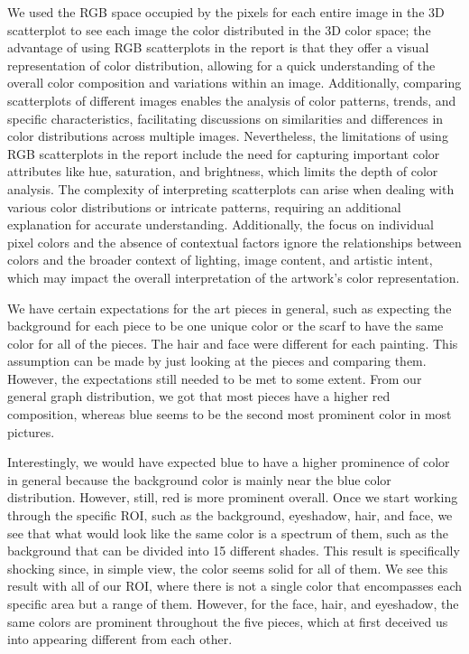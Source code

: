 \documentclass{article}
\begin{document}
We used the RGB space occupied by the pixels for each entire image in
the 3D scatterplot to see each image the color distributed in the 3D
color space; the advantage of using RGB scatterplots in the report is
that they offer a visual representation of color distribution, allowing
for a quick understanding of the overall color composition and
variations within an image. Additionally, comparing scatterplots of
different images enables the analysis of color patterns, trends, and
specific characteristics, facilitating discussions on similarities and
differences in color distributions across multiple images. Nevertheless,
the limitations of using RGB scatterplots in the report include the need
for capturing important color attributes like hue, saturation, and
brightness, which limits the depth of color analysis. The complexity of
interpreting scatterplots can arise when dealing with various color
distributions or intricate patterns, requiring an additional explanation
for accurate understanding. Additionally, the focus on individual pixel
colors and the absence of contextual factors ignore the relationships
between colors and the broader context of lighting, image content, and
artistic intent, which may impact the overall interpretation of the
artwork's color representation.

We have certain expectations for the art pieces in general, such as
expecting the background for each piece to be one unique color or the
scarf to have the same color for all of the pieces. The hair and face
were different for each painting. This assumption can be made by just
looking at the pieces and comparing them. However, the expectations
still needed to be met to some extent. From our general graph
distribution, we got that most pieces have a higher red composition,
whereas blue seems to be the second most prominent color in most
pictures.

Interestingly, we would have expected blue to have a higher prominence
of color in general because the background color is mainly near the blue
color distribution. However, still, red is more prominent overall. Once
we start working through the specific ROI, such as the background,
eyeshadow, hair, and face, we see that what would look like the same
color is a spectrum of them, such as the background that can be divided
into 15 different shades. This result is specifically shocking since, in
simple view, the color seems solid for all of them. We see this result
with all of our ROI, where there is not a single color that encompasses
each specific area but a range of them. However, for the face, hair, and
eyeshadow, the same colors are prominent throughout the five pieces,
which at first deceived us into appearing different from each other.
\end{document}
